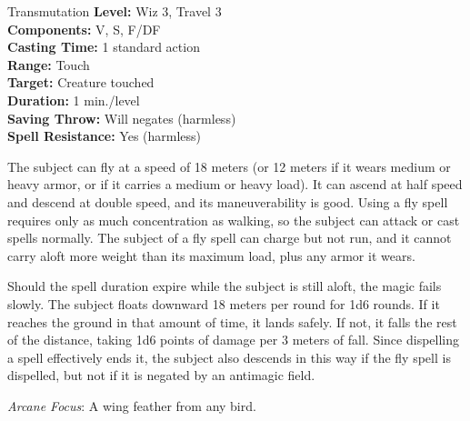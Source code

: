 {Transmutation}
{
	\textbf{Level:}
	Wiz 3, Travel 3\\
	\textbf{Components:}
	V, S, F/DF\\
	\textbf{Casting Time:}
	1 standard action\\
	\textbf{Range:}
	Touch\\
	\textbf{Target:}
	Creature touched\\
	\textbf{Duration:}
	1 min./level\\
	\textbf{Saving Throw:}
	Will negates (harmless)\\
	\textbf{Spell Resistance:}
	Yes (harmless)\\
}
{
	The subject can fly at a speed of 18 meters (or 12 meters if it wears medium or heavy armor, or if it carries a medium or heavy load). It can ascend at half speed and descend at double speed, and its maneuverability is good. Using a fly spell requires only as much concentration as walking, so the subject can attack or cast spells normally. The subject of a fly spell can charge but not run, and it cannot carry aloft more weight than its maximum load, plus any armor it wears.

	Should the spell duration expire while the subject is still aloft, the magic fails slowly. The subject floats downward 18 meters per round for 1d6 rounds. If it reaches the ground in that amount of time, it lands safely. If not, it falls the rest of the distance, taking 1d6 points of damage per 3 meters of fall. Since dispelling a spell effectively ends it, the subject also descends in this way if the fly spell is dispelled, but not if it is negated by an antimagic field.

	\textit{Arcane Focus}:
	A wing feather from any bird.

}
